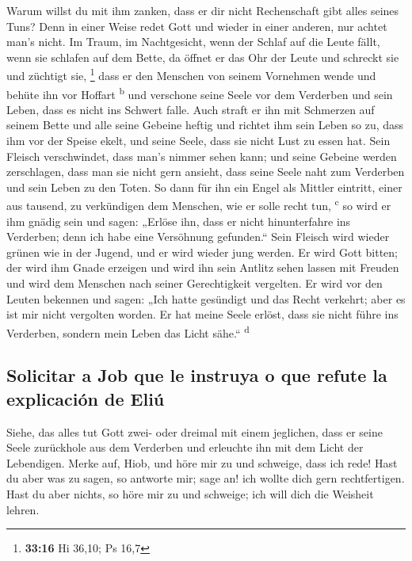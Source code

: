  Warum willst du mit ihm zanken, dass er dir nicht
Rechenschaft gibt alles seines Tuns?  Denn in einer Weise
redet Gott und wieder in einer anderen, nur achtet man's nicht.
 Im Traum, im Nachtgesicht, wenn der Schlaf auf die Leute
fällt, wenn sie schlafen auf dem Bette,  da öffnet er das
Ohr der Leute und schreckt sie und züchtigt sie, \footnote{\textbf{33:16}
  Hi 36,10; Ps 16,7}  dass er den Menschen von seinem
Vornehmen wende und behüte ihn vor Hoffart \textsuperscript{b}
 und verschone seine Seele vor dem Verderben und sein
Leben, dass es nicht ins Schwert falle.  Auch straft er
ihn mit Schmerzen auf seinem Bette und alle seine Gebeine heftig
 und richtet ihm sein Leben so zu, dass ihm vor der
Speise ekelt, und seine Seele, dass sie nicht Lust zu essen hat.
 Sein Fleisch verschwindet, dass man's nimmer sehen kann;
und seine Gebeine werden zerschlagen, dass man sie nicht gern ansieht,
 dass seine Seele naht zum Verderben und sein Leben zu
den Toten.  So dann für ihn ein Engel als Mittler
eintritt, einer aus tausend, zu verkündigen dem Menschen, wie er solle
recht tun, \textsuperscript{c}  so wird er ihm gnädig
sein und sagen: „Erlöse ihn, dass er nicht hinunterfahre ins Verderben;
denn ich habe eine Versöhnung gefunden.``  Sein Fleisch
wird wieder grünen wie in der Jugend, und er wird wieder jung werden.
 Er wird Gott bitten; der wird ihm Gnade erzeigen und
wird ihn sein Antlitz sehen lassen mit Freuden und wird dem Menschen
nach seiner Gerechtigkeit vergelten.  Er wird vor den
Leuten bekennen und sagen: „Ich hatte gesündigt und das Recht verkehrt;
aber es ist mir nicht vergolten worden.  Er hat meine
Seele erlöst, dass sie nicht führe ins Verderben, sondern mein Leben das
Licht sähe.`` \textsuperscript{d}

\hypertarget{solicitar-a-job-que-le-instruya-o-que-refute-la-explicaciuxf3n-de-eliuxfa}{%
\subsection{Solicitar a Job que le instruya o que refute la explicación
de
Eliú}\label{solicitar-a-job-que-le-instruya-o-que-refute-la-explicaciuxf3n-de-eliuxfa}}

 Siehe, das alles tut Gott zwei- oder dreimal mit einem
jeglichen,  dass er seine Seele zurückhole aus dem
Verderben und erleuchte ihn mit dem Licht der Lebendigen.
 Merke auf, Hiob, und höre mir zu und schweige, dass ich
rede!  Hast du aber was zu sagen, so antworte mir; sage
an! ich wollte dich gern rechtfertigen.  Hast du aber
nichts, so höre mir zu und schweige; ich will dich die Weisheit lehren.


